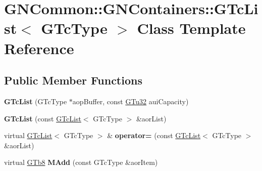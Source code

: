 \hypertarget{class_g_n_common_1_1_g_n_containers_1_1_g_tc_list}{}\section{G\+N\+Common\+:\+:G\+N\+Containers\+:\+:G\+Tc\+List$<$ G\+Tc\+Type $>$ Class Template Reference}
\label{class_g_n_common_1_1_g_n_containers_1_1_g_tc_list}
\subsection*{Public Member Functions}
\begin{DoxyCompactItemize}
\item 
\mbox{\label{class_g_n_common_1_1_g_n_containers_1_1_g_tc_list_a0a7d9dedfe8d91abaef0a037910472cd}} 
{\bfseries G\+Tc\+List} (G\+Tc\+Type $\ast$aop\+Buffer, const \mbox{\hyperlink{namespace_g_n_common_ae5485474bc8f23e462e920a17b377b53}{G\+Tu32}} aui\+Capacity)
\item 
\mbox{\label{class_g_n_common_1_1_g_n_containers_1_1_g_tc_list_a36e56c7b6659a448750f902a0026acc0}} 
{\bfseries G\+Tc\+List} (const \mbox{\hyperlink{class_g_n_common_1_1_g_n_containers_1_1_g_tc_list}{G\+Tc\+List}}$<$ G\+Tc\+Type $>$ \&aor\+List)
\item 
\mbox{\label{class_g_n_common_1_1_g_n_containers_1_1_g_tc_list_a025e8a62abb5e84151e21416c407973b}} 
virtual \mbox{\hyperlink{class_g_n_common_1_1_g_n_containers_1_1_g_tc_list}{G\+Tc\+List}}$<$ G\+Tc\+Type $>$ \& {\bfseries operator=} (const \mbox{\hyperlink{class_g_n_common_1_1_g_n_containers_1_1_g_tc_list}{G\+Tc\+List}}$<$ G\+Tc\+Type $>$ \&aor\+List)
\item 
\mbox{\label{class_g_n_common_1_1_g_n_containers_1_1_g_tc_list_a5be808b45c02b78691c5e1ba66fa4e49}} 
virtual \mbox{\hyperlink{namespace_g_n_common_a6b5283329f609e2175dd0c91fc1520ba}{G\+Tb8}} {\bfseries M\+Add} (const G\+Tc\+Type \&aor\+Item)
\item 
\mbox{\label{class_g_n_common_1_1_g_n_containers_1_1_g_tc_list_a81e27759dcd8ca8fcd3277866a5ba5fd}} 

\end{DoxyCompactItemize}
